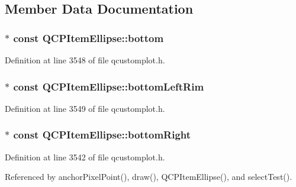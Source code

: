 \subsection{Member Data Documentation}
\hypertarget{class_q_c_p_item_ellipse_a2dc80ff9f5db600eae0133bdde65066f}{}
\subsubsection[{bottom}]{$\ast$ const Q\+C\+P\+Item\+Ellipse\+::bottom}\label{class_q_c_p_item_ellipse_a2dc80ff9f5db600eae0133bdde65066f}


Definition at line 3548 of file qcustomplot.\+h.

\hypertarget{class_q_c_p_item_ellipse_a31f31a9e9f9098c90fb47573094276c5}{}
\subsubsection[{bottom\+Left\+Rim}]{$\ast$ const Q\+C\+P\+Item\+Ellipse\+::bottom\+Left\+Rim}\label{class_q_c_p_item_ellipse_a31f31a9e9f9098c90fb47573094276c5}


Definition at line 3549 of file qcustomplot.\+h.

\hypertarget{class_q_c_p_item_ellipse_ab73c8deafc0d8d1ef7d75b6cdcc37159}{}
\subsubsection[{bottom\+Right}]{$\ast$ const Q\+C\+P\+Item\+Ellipse\+::bottom\+Right}\label{class_q_c_p_item_ellipse_ab73c8deafc0d8d1ef7d75b6cdcc37159}


Definition at line 3542 of file qcustomplot.\+h.



Referenced by anchor\+Pixel\+Point(), draw(), Q\+C\+P\+Item\+Ellipse(), and select\+Test().

